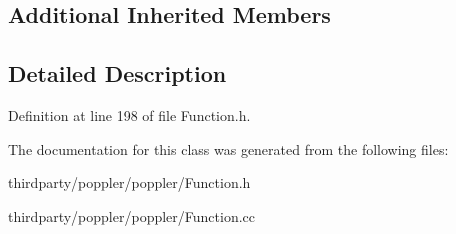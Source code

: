 \subsection*{Additional Inherited Members}


\subsection{Detailed Description}


Definition at line 198 of file Function.\+h.



The documentation for this class was generated from the following files\+:\begin{DoxyCompactItemize}
\item 
thirdparty/poppler/poppler/Function.\+h\item 
thirdparty/poppler/poppler/Function.\+cc\end{DoxyCompactItemize}
